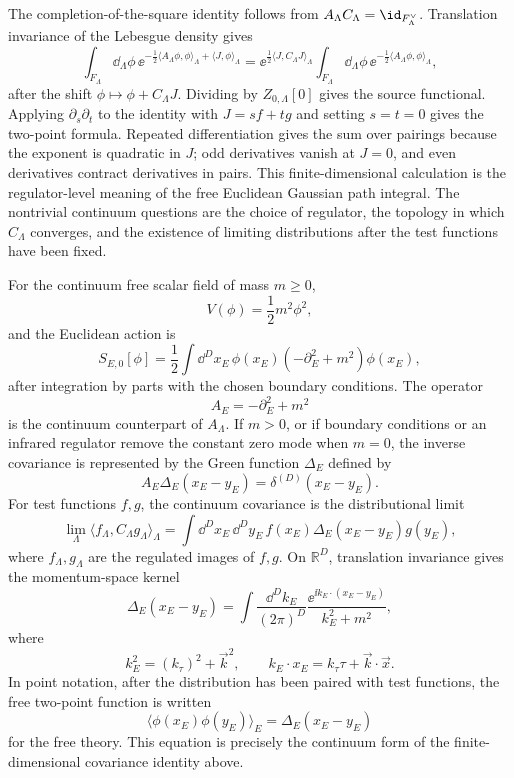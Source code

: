 The completion-of-the-square identity follows from
\(A_\Lambda C_\Lambda=\id_{F_\Lambda^\vee}\).  Translation invariance of the
Lebesgue density gives
\[
  \int_{F_\Lambda}\dd_\Lambda\phi\,
  \ee^{-\frac12\langle A_\Lambda\phi,\phi\rangle_\Lambda+\langle J,\phi\rangle_\Lambda}
  =
  \ee^{\frac12\langle J,C_\Lambda J\rangle_\Lambda}
  \int_{F_\Lambda}\dd_\Lambda\phi\,
  \ee^{-\frac12\langle A_\Lambda\phi,\phi\rangle_\Lambda},
\]
after the shift \(\phi\mapsto\phi+C_\Lambda J\).  Dividing by
\(Z_{0,\Lambda}[0]\) gives the source functional.  Applying
\(\partial_s\partial_t\) to the identity with \(J=sf+tg\) and setting
\(s=t=0\) gives the two-point formula.  Repeated differentiation gives the
sum over pairings because the exponent is quadratic in \(J\); odd derivatives
vanish at \(J=0\), and even derivatives contract derivatives in pairs.
This finite-dimensional calculation is the regulator-level meaning of the free
Euclidean Gaussian path integral.  The nontrivial continuum questions are the
choice of regulator, the topology in which \(C_\Lambda\) converges, and the
existence of limiting distributions after the test functions have been fixed.

\begin{definition}
\label{def:continuum-free-scalar-euclidean-covariance}
For the continuum free scalar field of mass \(m\ge0\),
\[
  V(\phi)=\frac12m^2\phi^2,
\]
and the Euclidean action is
\[
  S_{E,0}[\phi]
  =
  \frac12
  \int\dd^Dx_E\,
  \phi(x_E)(-\partial_E^2+m^2)\phi(x_E),
\]
after integration by parts with the chosen boundary conditions. The operator
\[
  A_E=-\partial_E^2+m^2
\]
is the continuum counterpart of \(A_\Lambda\).  If \(m>0\), or if boundary
conditions or an infrared regulator remove the constant zero mode when
\(m=0\), the inverse covariance is represented by the Green function
\(\Delta_E\) defined by
\[
  A_E\Delta_E(x_E-y_E)=\delta^{(D)}(x_E-y_E).
\]
For test functions \(f,g\), the continuum covariance is the distributional
limit
\[
  \lim_{\Lambda}
  \langle f_\Lambda,C_\Lambda g_\Lambda\rangle_\Lambda
  =
  \int\dd^Dx_E\,\dd^Dy_E\,
  f(x_E)\Delta_E(x_E-y_E)g(y_E),
\]
where \(f_\Lambda,g_\Lambda\) are the regulated images of \(f,g\).  On
\(\mathbb R^D\), translation invariance gives the momentum-space kernel
\[
  \Delta_E(x_E-y_E)
  =
  \int\frac{\dd^Dk_E}{(2\pi)^D}
  \frac{\ee^{\ii k_E\cdot(x_E-y_E)}}{k_E^2+m^2},
\]
where
\[
  k_E^2=(k_\tau)^2+\vec k^2,
  \qquad
  k_E\cdot x_E=k_\tau\tau+\vec k\cdot\vec x.
\]
In point notation, after the distribution has been paired with test functions,
the free two-point function is written
\[
  \langle\phi(x_E)\phi(y_E)\rangle_E=\Delta_E(x_E-y_E)
\]
for the free theory.  This equation is precisely the continuum form of the
finite-dimensional covariance identity above.
\end{definition}

